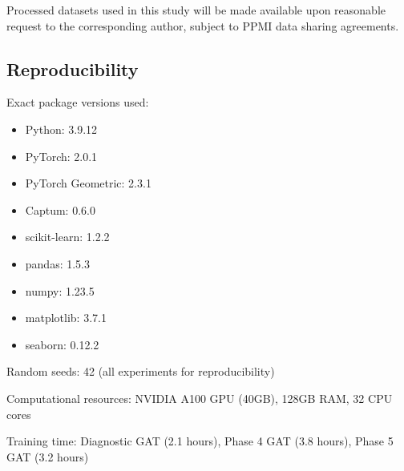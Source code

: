 \documentclass[11pt]{article}
\begin{document}
Processed datasets used in this study will be made available upon reasonable request to the corresponding author, subject to PPMI data sharing agreements.

\subsection{Reproducibility}

Exact package versions used:
\begin{itemize}
\item Python: 3.9.12
\item PyTorch: 2.0.1
\item PyTorch Geometric: 2.3.1
\item Captum: 0.6.0
\item scikit-learn: 1.2.2
\item pandas: 1.5.3
\item numpy: 1.23.5
\item matplotlib: 3.7.1
\item seaborn: 0.12.2
\end{itemize}

Random seeds: 42 (all experiments for reproducibility)

Computational resources: NVIDIA A100 GPU (40GB), 128GB RAM, 32 CPU cores

Training time: Diagnostic GAT (2.1 hours), Phase 4 GAT (3.8 hours), Phase 5 GAT (3.2 hours)
\end{document}
